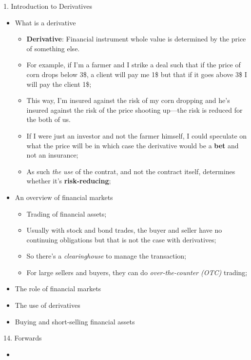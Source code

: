 \documentclass[12pt, titlepage, french]{report}
\begin{document}
\begin{CHPT_SUMM_AUTO}[label = {L.-1}]{1. Introduction to Derivatives}
	\begin{itemize}
	\item	What is a derivative
		\begin{itemize}
		\item	\textbf{Derivative}: Financial \og instrument \fg{} whole value is determined by the price of something else.
		\item	For example, if I'm a farmer and I strike a deal such that if the price of corn drops below 3\$, a client will pay me 1\$ but that if it goes above 3\$ I will pay the client 1\$;
		\item[]	This way, I'm insured against the risk of my corn dropping and he's insured against the risk of the price shooting up---the risk is reduced for the both of us.
		\item	If I were just an investor and not the farmer himself, I could speculate on what the price will be in which case the derivative would be a \textbf{bet} and not an insurance;
		\item	As such \textit{the use} of the contrat, and not the contract itself, determines whether it's \textbf{risk-reducing};
		\end{itemize}
	\item	An overview of financial markets
		\begin{itemize}
		\item	Trading of financial assets;
			\item	Usually with stock and bond trades, the buyer and seller have no continuing obligations but that is not the case with derivatives;
			\item	So there's a \textit{clearinghouse} to manage the transaction;
		\item	For large sellers and buyers, they can do \textit{over-the-counter (OTC)} trading;
		
		\end{itemize}
	\item	The role of financial markets
	\item	The use of derivatives
	\item	Buying and short-selling financial assets
	\end{itemize}
\end{CHPT_SUMM_AUTO}

\begin{CHPT_SUMM_AUTO}[label = {L.-14}]{14. Forwards}
	\begin{itemize}
		\item	
	\end{itemize}
\end{CHPT_SUMM_AUTO}
\end{document}
